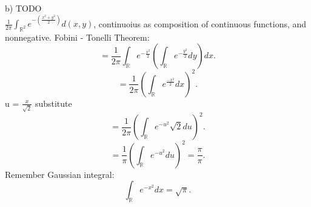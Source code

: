 \begin{exercise}[9.7]
    \label{ex:9.7}
    b) TODO\\
    $\frac{1}{2\pi} \int_{\mathbb{R}^{2}} e^{-(\frac{x^{2}+y^{2}}{2})}d(x,y)$, continuoius as composition of continuous
    functions, and nonnegative. Fobini - Tonelli Theorem:
    \[
    = \frac{1}{2\pi} \int_{\mathbb{R}} e^{-\frac{x^{2}}{2}} (\int_{\mathbb{R}} e^{-\frac{y^{2}}{2}}dy) dx
    .\] 
    \[
    = \frac{1}{2\pi} (\int_{\mathbb{R}} e^{\frac{-x^{2}}{2}} dx)^{2}
    .\] 
    u = $\frac{x}{\sqrt{2} }$ substitute
    \[
    = \frac{1}{2\pi} (\int_{\mathbb{R}} e^{-u^{2}} \sqrt{2} du)^{2}
    .\] 
    \[
    = \frac{1}{\pi} (\int_{\mathbb{R}} e^{-u^{2}}du)^{2} = \frac{\pi}{\pi}
    .\] 
    Remember Gaussian integral:
    \[
    \int_{\mathbb{R}} e^{-x^{2}}dx = \sqrt{\pi} 
    .\] 
\end{exercise}
